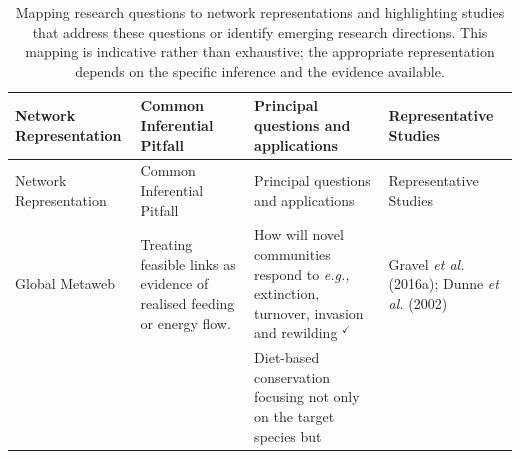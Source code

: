 \documentclass[
]{article}
\begin{document}
\begin{longtable}[]{@{}
  >{\raggedright\arraybackslash}p{}
  >{\raggedright\arraybackslash}p{}
  >{\raggedright\arraybackslash}p{}
  >{\raggedright\arraybackslash}p{}@{}}
\caption{Mapping research questions to network representations and
highlighting studies that address these questions or identify emerging
research directions. This mapping is indicative rather than exhaustive;
the appropriate representation depends on the specific inference and the
evidence available.}\label{tbl-questions}\tabularnewline
\toprule\noalign{}
\begin{minipage}[b]{\linewidth}\raggedright
Network Representation
\end{minipage} & \begin{minipage}[b]{\linewidth}\raggedright
Common Inferential Pitfall
\end{minipage} & \begin{minipage}[b]{\linewidth}\raggedright
Principal questions and applications
\end{minipage} & \begin{minipage}[b]{\linewidth}\raggedright
Representative Studies
\end{minipage} \\
\midrule\noalign{}
\endfirsthead
\toprule\noalign{}
\begin{minipage}[b]{\linewidth}\raggedright
Network Representation
\end{minipage} & \begin{minipage}[b]{\linewidth}\raggedright
Common Inferential Pitfall
\end{minipage} & \begin{minipage}[b]{\linewidth}\raggedright
Principal questions and applications
\end{minipage} & \begin{minipage}[b]{\linewidth}\raggedright
Representative Studies
\end{minipage} \\
\midrule\noalign{}
\endhead
\bottomrule\noalign{}
\endlastfoot
Global Metaweb & Treating feasible links as evidence of realised feeding
or energy flow. & How will novel communities respond to \emph{e.g.,}
extinction, turnover, invasion and rewilding \(^\checkmark\) & Gravel
\emph{et al.} (2016a); Dunne \emph{et al.} (2002) \\
& & Diet-based conservation focusing not only on the target species but

\end{longtable}
\end{document}
